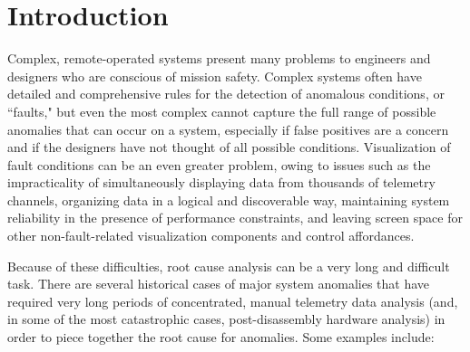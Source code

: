 \chapter{Introduction}

Complex, remote-operated systems present many problems to engineers and designers who are conscious of mission safety. Complex systems often have detailed and comprehensive rules for the detection of anomalous conditions, or ``faults," but even the most complex cannot capture the full range of possible anomalies that can occur on a system, especially if false positives are a concern and if the designers have not thought of all possible conditions. Visualization of fault conditions can be an even greater problem, owing to issues such as the impracticality of simultaneously displaying data from thousands of telemetry channels, organizing data in a logical and discoverable way, maintaining system reliability in the presence of performance constraints, and leaving screen space for other non-fault-related visualization components and control affordances.

Because of these difficulties, root cause analysis can be a very long and difficult task. There are several historical cases of major system anomalies that have required very long periods of concentrated, manual telemetry data analysis (and, in some of the most catastrophic cases, post-disassembly hardware analysis) in order to piece together the root cause for anomalies. Some examples include:

